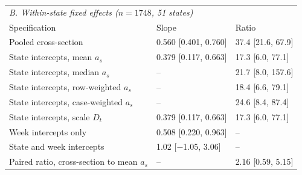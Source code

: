 \begin{table}[htbp]
\bigskip
\begin{tabular}{lll}
\toprule
\multicolumn{3}{l}{\textit{B. Within-state fixed effects ($n=1748$, 51 states)}}\\
Specification & Slope & Ratio \\
\midrule
Pooled cross-section & 0.560 [0.401, 0.760] & 37.4 [21.6, 67.9] \\
State intercepts, mean $a_s$ & 0.379 [0.117, 0.663] & 17.3 [6.0, 77.1] \\
State intercepts, median $a_s$ & -- & 21.7 [8.0, 157.6] \\
State intercepts, row-weighted $a_s$ & -- & 18.4 [6.6, 79.1] \\
State intercepts, case-weighted $a_s$ & -- & 24.6 [8.4, 87.4] \\
State intercepts, scale $D_t$ & 0.379 [0.117, 0.663] & 17.3 [6.0, 77.1] \\
Week intercepts only & 0.508 [0.220, 0.963] & -- \\
State and week intercepts & 1.02 [$-$1.05, 3.06] & -- \\
Paired ratio, cross-section to mean $a_s$ & -- & 2.16 [0.59, 5.15] \\
\bottomrule
\end{tabular}
\end{table}
